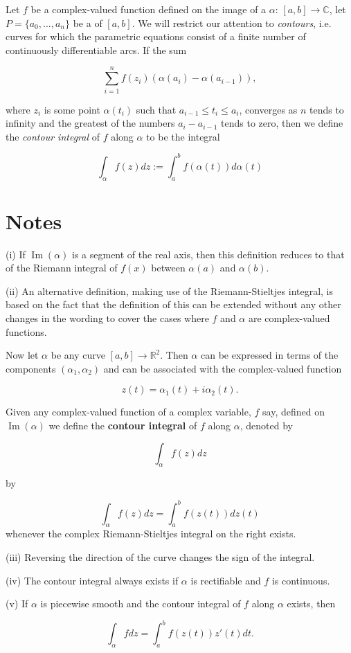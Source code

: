 \documentclass[12pt]{article}
\renewcommand{\Im}{\operatorname{Im}}
\begin{document}

Let $f$ be a complex-valued function defined on the image of a  $\alpha$: $[ a, b ] \rightarrow \mathbb{C}$, let $P = \{ a_{0}, ..., a_{n} \}$ be a  of $[ a, b ]$.  We will restrict our attention to \emph{contours}, i.e. curves for which the parametric equations consist of a finite number of continuously differentiable arcs. 
If the sum

$$\sum_{i = 1}^{n} f(z_{i}) (\alpha(a_{i}) - \alpha(a_{i - 1})),$$

where $z_{i}$ is some point $\alpha(t_{i})$ such that $a_{i - 1} \leqslant t_{i} \leqslant a_{i}$, converges as $n$ tends to infinity and the greatest of the numbers $a_{i} - a_{i - 1}$ tends to zero, then we define the \emph{contour integral} of $f$ along $\alpha$ to be the integral

$$\int_{\alpha} f(z) dz:=\int_a^b f(\alpha(t))d\alpha(t)$$

\section*{Notes} (i) If $\Im(\alpha)$ is a segment of the real axis, then this definition reduces to that of the Riemann integral of $f(x)$ between $\alpha (a)$ and $\alpha (b)$.

(ii) An alternative definition, making use of the Riemann-Stieltjes integral, is based on the fact that the definition of this can be extended without any other changes in the wording to cover the cases where $f$ and $\alpha$ are complex-valued functions.

Now let $\alpha$ be any curve $[a, b] \rightarrow \mathbb{R}^{2}$.  Then $\alpha$ can be expressed in terms of the components $(\alpha_{1}, \alpha_{2})$ and can be associated with the complex-valued function

$$z(t) = \alpha_{1}(t) + i \alpha_{2}(t).$$

Given any complex-valued function of a complex variable, $f$ say, defined on $\Im(\alpha)$ we define the \textbf{contour integral} of $f$ along $\alpha$, denoted by

$$\int_{\alpha} f(z) dz$$

by

$$\int_{\alpha} f(z) dz = \int_{a}^{b} f(z(t)) dz(t)$$
whenever the complex Riemann-Stieltjes integral on the right exists.

(iii) Reversing the direction of the curve changes the sign of the integral.

(iv) The contour integral always exists if $\alpha$ is rectifiable and $f$ is continuous.

(v) If $\alpha$ is piecewise smooth and the contour integral of $f$ along $\alpha$ exists, then

$$\int_{\alpha} f dz = \int_{a}^{b} f(z(t)) z'(t) dt.$$
\end{document}
